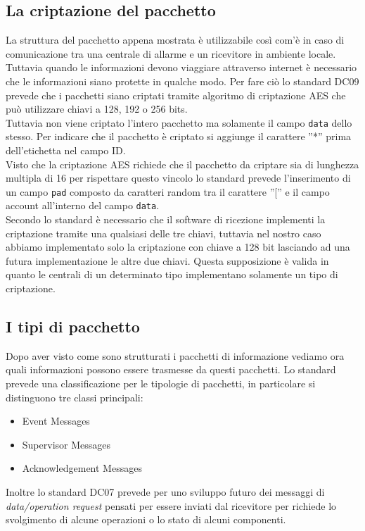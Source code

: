 \subsection{La criptazione del pacchetto}
La struttura del pacchetto appena mostrata è utilizzabile così com'è in caso di comunicazione tra una centrale di allarme e un ricevitore in ambiente locale. Tuttavia quando le informazioni devono viaggiare attraverso internet è necessario che le informazioni siano protette in qualche modo. Per fare ciò lo standard DC09 prevede che i pacchetti siano criptati tramite algoritmo di criptazione AES che può utilizzare chiavi a 128, 192 o 256 bits.\\
Tuttavia non viene criptato l'intero pacchetto ma solamente il campo \texttt{data} dello stesso. Per indicare che il pacchetto è criptato si aggiunge il carattere ''*'' prima dell'etichetta nel campo ID.\\
Visto che la criptazione AES richiede che il pacchetto da criptare sia di lunghezza multipla di 16 per rispettare questo vincolo lo standard prevede l'inserimento di un campo \texttt{pad} composto da caratteri random tra il carattere ''['' e il campo account all'interno del campo \texttt{data}.\\
Secondo lo standard è necessario che il software di ricezione implementi la criptazione tramite una qualsiasi delle tre chiavi, tuttavia nel nostro caso abbiamo implementato solo la criptazione con chiave a 128 bit lasciando ad una futura implementazione le altre due chiavi. Questa supposizione è valida in quanto le centrali di un determinato tipo implementano solamente un tipo di criptazione.
\subsection{I tipi di pacchetto}
Dopo aver visto come sono strutturati i pacchetti di informazione vediamo ora quali informazioni possono essere trasmesse da questi pacchetti.
Lo standard prevede una classificazione per le tipologie di pacchetti, in particolare si distinguono tre classi principali:
\begin{itemize}
	\item Event Messages
	\item Supervisor Messages
	\item Acknowledgement Messages
\end{itemize}
Inoltre lo standard DC07 prevede per uno sviluppo futuro dei messaggi di \emph{data/operation request} pensati per essere inviati dal ricevitore per richiede lo svolgimento di alcune operazioni o lo stato di alcuni componenti.
